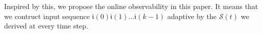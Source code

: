Inspired by this, we propose the online observability in this paper. It means that we contruct input sequence $\mathfrak{i}(0)$$\mathfrak{i}(1)\ldots$$\mathfrak{i}(k-1)$ adaptive by the $\mathcal{S}(t)$ we derived at every time step. %

